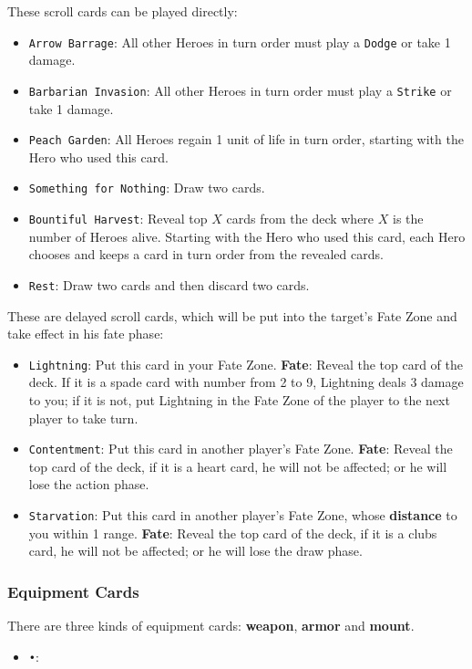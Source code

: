 \documentclass[11pt,a4paper]{article}
\begin{document}
These scroll cards can be played directly:
\begin{itemize}
\item \texttt{Arrow Barrage}: All other Heroes in turn order must play a \texttt{Dodge} or take 1 damage.
\item \texttt{Barbarian Invasion}: All other Heroes in turn order must play a \texttt{Strike} or take 1 damage.
\item \texttt{Peach Garden}: All Heroes regain 1 unit of life in turn order, starting with the Hero who used this card.
\item \texttt{Something for Nothing}: Draw two cards.
\item \texttt{Bountiful Harvest}: Reveal top $X$ cards from the deck where $X$ is the number of Heroes alive. Starting with the Hero who used this card, each Hero chooses and keeps a card in turn order from the revealed cards.
\item \texttt{Rest}: Draw two cards and then discard two cards.
\end{itemize} 

These are delayed scroll cards, which will be put into the target's Fate Zone and take effect in his fate phase:
\begin{itemize}
\item \texttt{Lightning}: Put this card in your Fate Zone. \textbf{Fate}: Reveal the top card of the deck. If it is a spade card with number from 2 to 9, Lightning deals 3 damage to you; if it is not, put Lightning in the Fate Zone of the player to the next player to take turn.
\item \texttt{Contentment}: Put this card in another player's Fate Zone. \textbf{Fate}: Reveal the top card of the deck, if it is a heart card, he will not be affected; or he will lose the action phase.
\item \texttt{Starvation}: Put this card in another player's Fate Zone, whose \textbf{distance} to you within 1 range. \textbf{Fate}: Reveal the top card of the deck, if it is a clubs card, he will not be affected; or he will lose the draw phase.
\end{itemize}

\subsubsection{Equipment Cards}
There are three kinds of equipment cards: \textbf{weapon}, \textbf{armor} and \textbf{mount}.

\begin{itemize}
\item \texttt{•}: 
\end{itemize}
\end{document}
